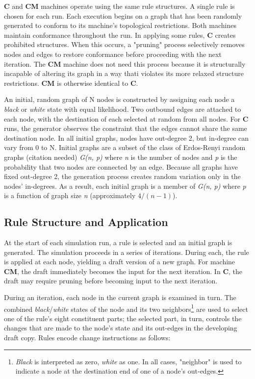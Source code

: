 \documentclass{tufte-handout}
\begin{document}
\textbf{C} and \textbf{CM} machines operate using the same rule structures.
A single rule is chosen for each run. Each execution
begins on a graph that has been randomly generated
to conform to its machine's topological restrictions. Both machines maintain conformance
throughout the run. In applying some rules, \textbf{C} creates prohibited
structures. When this occurs, a "pruning" process selectively
removes nodes and edges to restore conformance before proceeding with the
next iteration. The \textbf{CM} machine does not need this process because
it is structurally incapable of altering its graph in a way thati violates its more
relaxed structure restrictions. \textbf{CM} is otherwise identical to \textbf{C}.  

An initial, random graph of N nodes is constructed by assigning each node
a \textit{black} or \textit{white} state with equal likelihood.
Two outbound edges are attached to each node, with
the destination of each selected at random from all nodes. For \textbf{C} runs, the
generator observes the constraint that the edges cannot share the same destination node.
In all initial graphs, nodes have out-degree 2, but in-degree can vary from 0 to N.
Initial graphs are a subset of the class of Erdos-Renyi random graphs (citation needed)
\textit{G(n, p)} where \textit{n} is the number of nodes and \textit{p} is the probability
that two nodes are connected by an edge. Because all graphs have fixed out-degree 2,
the generation process creates random variation only in the nodes' in-degrees. As a result,
each initial graph is a member of \textit{G(n, p)} where \textit{p} is a function
of graph size \textit{n} (approximately \( 4 / (n - 1) \)).

\subsection{Rule Structure and Application}

At the start of each simulation run, a rule is selected and an initial graph
is generated.  The simulation proceeds in a series of
iterations. During each, the rule is applied at each node, yielding a draft
version of a new graph. For machine \textbf{CM}, the draft immediately becomes
the input for the next iteration. In \textbf{C}, the draft may require pruning
before becoming input to the next iteration. 

During an iteration, each node in the current graph is examined in turn.
The combined \textit{black}/\textit{white} states of the node and its two neighbors\footnote{
\textit{Black} is interpreted as zero, \textit{white} as one. In
all cases, "neighbor" is used to indicate a node at the destination end of one of a node's out-edges.}
are used to select one of the rule's eight constituent parts; the selected part, in turn,
controls the changes that are made to the node's state and its out-edges in
the developing draft copy. Rules encode change instructions as follows:
\end{document}
